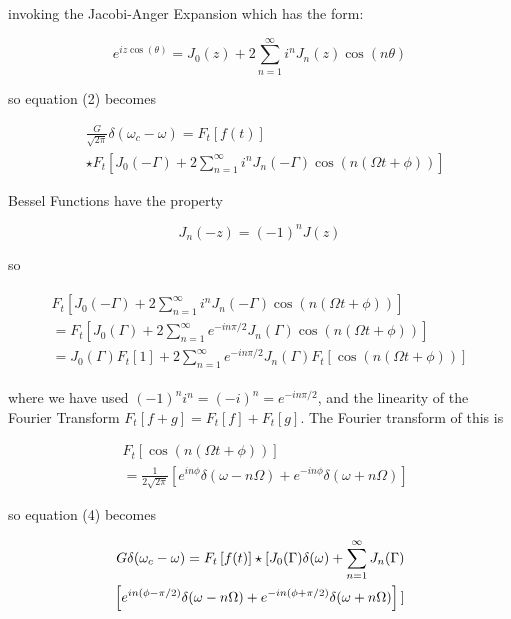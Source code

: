 \documentclass[twocolumn, groupedaddress]{revtex4-1}
\begin{document}
invoking the Jacobi-Anger Expansion which has the form:

\begin{equation}
e^{iz\cos (\theta)} = J_0(z) + 2 \sum_{n=1}^{\infty} i^n J_n(z) \cos (n\theta)
\end{equation}

so equation (2) becomes

\begin{align}
&\frac{G}{\sqrt{2\pi}} \delta (\omega_c - \omega) = \nonumber
F_t \left[ f(t) \right] \\
&\star F_t \left[ J_0(-\Gamma) + 2 \sum_{n=1}^{\infty} i^n J_n(-\Gamma) \cos (n(\Omega t + \phi)) \right]
\end{align}

Bessel Functions have the property 

\begin{equation}
J_n(-z) = (-1)^n J(z)
\end{equation}

so 

\begin{align}
\begin{aligned}
F_t \left[ J_0(-\Gamma) + 2 \sum_{n=1}^{\infty} i^n J_n(-\Gamma) \cos (n(\Omega t + \phi)) \right] \\
= F_t \left[ J_0(\Gamma) + 2 \sum_{n=1}^{\infty} e^{-in\pi/2} J_n(\Gamma) \cos (n(\Omega t + \phi)) \right] \\
= J_0(\Gamma) F_t \left[ 1 \right] + 2 \sum_{n=1}^{\infty} e^{-in\pi/2} J_n(\Gamma) F_t \left[ \cos (n(\Omega t + \phi)) \right]
\end{aligned}
\end{align}

where we have used $(-1)^n i^n = (-i)^n = e^{-in\pi/2}$, and the linearity of the Fourier Transform $F_t[f+g]=F_t[f]+F_t[g]$.  The Fourier transform of this is 

\begin{align}
&F_t \left[ \cos (n(\Omega t + \phi)) \right] \nonumber
	\\ &= \frac{1}{2\sqrt{2\pi}} \left[ e^{in\phi} \delta (\omega - n\Omega) + e^{-in\phi} \delta (\omega + n\Omega) \right]
\end{align}

so equation (4) becomes

\begin{align}
G \delta (\omega_c - \omega) = 
F_t \left[ f(t) \right] \star 
\Huge{[} J_0(\Gamma) \delta (\omega) + \sum_{n=1}^{\infty} J_n(\Gamma) 		\nonumber
	\\ \left[ e^{in(\phi - \pi/2)} \delta (\omega - n\Omega) + e^{-in(\phi + \pi/2)} \delta (\omega + n\Omega) \right]
\Huge{]}
\end{align}
\end{document}
